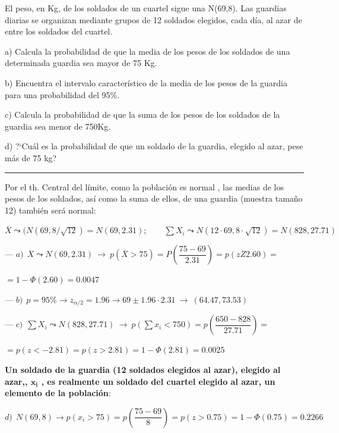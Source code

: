 \begin{ejemplo}
\begin{ejre}
El peso, en Kg, de los soldados de un cuartel sigue una N(69,8). Las guardias diarias se organizan mediante grupos de 12 soldados elegidos, cada día, al azar de entre los soldados del cuartel.

\begin{adjustwidth}{10pt}{}
a) Calcula la probabilidad de que la media de los pesos de los soldados de una determinada guardia sea mayor de 75 Kg.

b) Encuentra el intervalo característico de la media de los pesos de la guardia para una probabilidad del 95\%.

c) Calcula la probabilidad de que la suma de los pesos de los soldados de la guardia sea menor de 750Kg.

d) ?`Cuál es la probabilidad de que un soldado de la guardia, elegido al azar, pese más de 75 kg?
\end{adjustwidth}

\rule{150pt}{0.1pt}

\vspace{2mm} 

Por el th. Central del límite, como la población es normal , las medias de los pesos de los soldados, así como la suma de ellos, de una guardia (muestra tamaño 12) también será normal:

$\displaystyle \overline X \leadsto (N(69,8/\sqrt{12})=N(69,2.31);\qquad  
\sum X_i \leadsto N(12\cdot 69, 8 \cdot  \sqrt{12})=N(828,27.71)$

--- $a)\ \ \overline{X} \leadsto N(69,2.31) \ \to \ p(\overline{X}>75)
= P\left( \dfrac{75-69}{2.31} \right) = p(zZ2.60)=$

$=1-\Phi(2.60)=0.0047$

--- $b)\ \ p=95\% \to z_{\alpha/2}=1.96 \longrightarrow 69\pm 1.96\cdot 2.31 \ \to \ (64.47,73.53)$

--- $c)\ \ \displaystyle \sum X_i \leadsto N(828,27.71) \ \to \ p \left( \sum x_i <750 \right)= p\left( \dfrac{650-828}{27.71} \right) = $

$=p(z<-2.81)=p(z>2.81)=1-\Phi(2.81)=0.0025 $

\begin{destacado}
\textbf{Un soldado de la guardia (12 soldados elegidos al azar), elegido al azar,,  $\boldsymbol{x_i}$ , es realmente un soldado del cuartel elegido al azar, un elemento de la población}: \end{destacado}

$d)\ \ N(69,8) \to p(x_i>75) = p\left( \dfrac{75-69}{8} \right) = p(z>0.75)=1-\Phi(0.75)=0.2266$

\end{ejre}	
\end{ejemplo}



